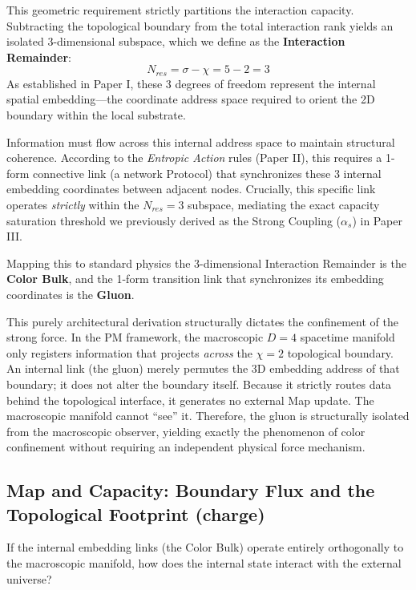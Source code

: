 This geometric requirement strictly partitions the interaction capacity. Subtracting the topological boundary from the total interaction rank yields an isolated 3-dimensional subspace, which we define as the \textbf{Interaction Remainder}:
\begin{equation}
    N_{res} = \sigma - \chi = 5 - 2 = 3
\end{equation}
As established in Paper I\cite{meyer_informational_2026}, these 3 degrees of freedom represent the internal spatial embedding—the coordinate address space required to orient the 2D boundary within the local substrate. 

Information must flow across this internal address space to maintain structural coherence. According to the \textit{Entropic Action} rules (Paper II), this requires a 1-form connective link (a network Protocol) that synchronizes these 3 internal embedding coordinates between adjacent nodes. Crucially, this specific link operates \textit{strictly} within the $N_{res} = 3$ subspace, mediating the exact capacity saturation threshold we previously derived as the Strong Coupling ($\alpha_s$) in Paper III.

Mapping this to standard physics the 3-dimensional Interaction Remainder is the \textbf{Color Bulk}, and the 1-form transition link that synchronizes its embedding coordinates is the \textbf{Gluon}. 

This purely architectural derivation structurally dictates the confinement of the strong force. In the PM framework, the macroscopic $D=4$ spacetime manifold only registers information that projects \textit{across} the $\chi=2$ topological boundary. An internal link (the gluon) merely permutes the 3D embedding address of that boundary; it does not alter the boundary itself. Because it strictly routes data behind the topological interface, it generates no external Map update. The macroscopic manifold cannot ``see'' it. Therefore, the gluon is structurally isolated from the macroscopic observer, yielding exactly the phenomenon of color confinement without requiring an independent physical force mechanism.

\subsection{Map and Capacity: Boundary Flux and the Topological Footprint (charge)}

If the internal embedding links (the Color Bulk) operate entirely orthogonally to the macroscopic manifold, how does the internal state interact with the external universe? 

